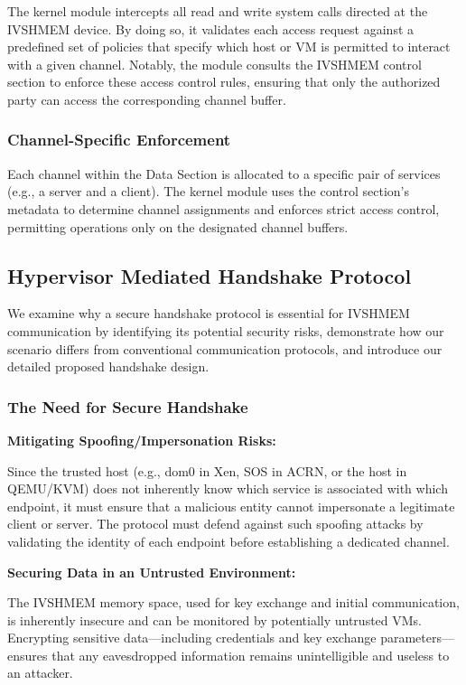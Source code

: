 \documentclass[conference]{IEEEtran}
\begin{document}
The kernel module intercepts all read and write system calls directed at the
IVSHMEM device. By doing so, it validates each access request against a
predefined set of policies that specify which host or VM is permitted to
interact with a given channel. Notably, the module consults the IVSHMEM control
section to enforce these access control rules, ensuring that only the
authorized party can access the corresponding channel buffer.

\subsubsection{Channel-Specific Enforcement}

Each channel within the Data Section is allocated to a specific pair of
services (e.g., a server and a client). The kernel module uses the control
section's metadata to determine channel assignments and enforces strict access
control, permitting operations only on the designated channel buffers.

\subsection{Hypervisor Mediated Handshake Protocol}

We examine why a secure handshake protocol is essential for IVSHMEM
communication by identifying its potential security risks, demonstrate how our
scenario differs from conventional communication protocols, and introduce our
detailed proposed handshake design.

\subsubsection{The Need for Secure Handshake}

\textbf{Mitigating Spoofing/Impersonation Risks:}

Since the trusted host (e.g., dom0 in Xen, SOS in ACRN, or the host in
QEMU/KVM) does not inherently know which service is associated with which
endpoint, it must ensure that a malicious entity cannot impersonate a
legitimate client or server. The protocol must defend against such spoofing
attacks by validating the identity of each endpoint before establishing a
dedicated channel.

\textbf{Securing Data in an Untrusted Environment:}

The IVSHMEM memory space, used for key exchange and initial communication, is
inherently insecure and can be monitored by potentially untrusted VMs.
Encrypting sensitive data—including credentials and key exchange
parameters—ensures that any eavesdropped information remains unintelligible and
useless to an attacker.
\end{document}
